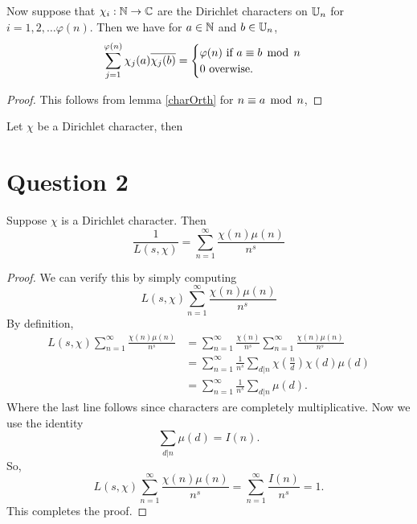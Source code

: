 \documentclass{unswmaths}
\begin{document}
    \begin{lemma}
        Now suppose that $\chi_i:\mathbb{N} \rightarrow \mathbb{C}$ are the Dirichlet characters on $\mathbb{U}_n$ for $i = 1,2,\ldots \varphi(n)$. Then we have for $a \in \mathbb{N}$ and $b\in \mathbb{U}_n$,
        \begin{equation*}
            \sum_{j=1}^{\varphi(n)} \chi_j(a)\overline{\chi_j(b)} = \begin{cases}
                \varphi(n)\text{ if }a \equiv b\;\operatorname{mod}\;n\\
                0\text{ overwise.}
            \end{cases}
        \end{equation*}
    \end{lemma}
    \begin{proof}
        This follows from lemma \ref{charOrth} for $n \equiv a \;\operatorname{mod}\;n$, 
    \end{proof}
    
    
    \begin{lemma}
        Let $\chi$ be a Dirichlet character, then
        
    \end{lemma}
    
    \section*{Question 2}
    \begin{proposition}
        Suppose $\chi$ is a Dirichlet character. Then
        \begin{equation*}
            \frac{1}{L(s,\chi)} = \sum_{n=1}^\infty \frac{\chi(n)\mu(n)}{n^s}
        \end{equation*}
    \end{proposition}
    \begin{proof}
        We can verify this by simply computing 
        \begin{equation*}
            L(s,\chi)\sum_{n=1}^\infty \frac{\chi(n)\mu(n)}{n^s}
        \end{equation*}
        By definition,
        \begin{align*}
            L(s,\chi)\sum_{n=1}^\infty \frac{\chi(n)\mu(n)}{n^s} &= \sum_{n=1}^\infty \frac{\chi(n)}{n^s}\sum_{n=1}^\infty \frac{\chi(n)\mu(n)}{n^s}\\
            &= \sum_{n=1}^\infty \frac{1}{n^s}\sum_{d|n} \chi\left(\frac{n}{d}\right)\chi(d)\mu(d)\\
            &= \sum_{n=1}^\infty \frac{1}{n^s}\sum_{d|n} \mu(d).
        \end{align*}
        Where the last line follows since characters are completely multiplicative. Now we use the identity
        \begin{equation*}
            \sum_{d|n}\mu(d) = I(n).
        \end{equation*}
        So,
        \begin{equation*}
            L(s,\chi)\sum_{n=1}^\infty \frac{\chi(n)\mu(n)}{n^s} = \sum_{n=1}^\infty \frac{I(n)}{n^s} = 1.
        \end{equation*}
        This completes the proof.
    \end{proof}
    
\end{document}
